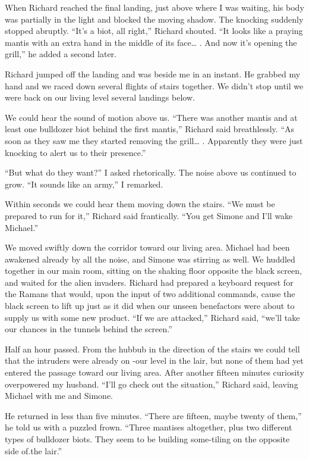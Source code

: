\documentclass[]{article}
\begin{document}
When Richard reached the final landing, just above where I was waiting, his body was partially in the light and blocked the moving shadow.  The knocking suddenly stopped abruptly.  “It’s a biot, all right,” Richard shouted.  “It looks like a praying mantis with an extra hand in the middle of its face… .  And now it’s opening the grill,” he added a second later.

Richard jumped off the landing and was beside me in an instant.  He grabbed my hand and we raced down several flights of stairs together.  We didn’t stop until we were back on our living level several landings below.

We could hear the sound of motion above us.  “There was another mantis and at least one bulldozer biot behind the first mantis,” Richard said breathlessly.  “As soon as they saw me they started removing the grill… .  Apparently they were just knocking to alert us to their presence.”

“But what do they want?” I asked rhetorically.  The noise above us continued to grow.  “It sounds like an army,” I remarked.

Within seconds we could hear them moving down the stairs.  “We must be prepared to run for it,” Richard said frantically.  “You get Simone and I’ll wake Michael.”

We moved swiftly down the corridor toward our living area.  Michael had been awakened already by all the noise, and Simone was stirring as well.  We huddled together in our main room, sitting on the shaking floor opposite the black screen, and waited for the alien invaders.  Richard had prepared a keyboard request for the Ramans that would, upon the input of two additional commands, cause the black screen to lift up just as it did when our unseen benefactors were about to supply us with some new product.  “If we are attacked,” Richard said, “we’ll take our chances in the tunnels behind the screen.”

Half an hour passed.  From the hubbub in the direction of the stairs we could tell that the intruders were already on -our level in the lair, but none of them had yet entered the passage toward our living area.  After another fifteen minutes curiosity overpowered my husband.  “I’ll go check out the situation,” Richard said, leaving Michael with me and Simone.

He returned in less than five minutes.  “There are fifteen, maybe twenty of them,” he told us with a puzzled frown.  “Three mantises altogether, plus two different types of bulldozer biots.  They seem to be building some-tiling on the opposite side of.the lair.”
\end{document}
